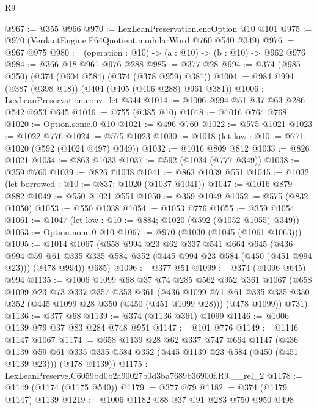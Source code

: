\begin{lexlean}{R9}
\begin{coremodule}
@967 := @355 @966
@970 := LexLeanPreservation.encOption @10 @101
@975 := @970 (VerdantEngine.F64Quotient.modularWord @760 @540 @349)
@976 := @967 @975
@980 := (operation : @10) -> (a : @10) -> (b : @10) -> @962 @976
@984 := @366 @18 @961 @976 @288
@985 := @377 @28
@994 := @374 (@985 @350) (@374 (@604 @584) (@374 (@378 @959) @381))
@1004 := @984 @994 (@387 (@398 @18)) (@404 (@405 (@406 @288) @961 @381))
@1006 := LexLeanPreservation.conv_let @344
@1014 := @1006 @994 @51 @37 @63 @286 @542 @953 @645
@1016 := @755 (@385 @10)
@1018 := @1016 @764 @768
@1020 := Option.some.{0} @10
@1021 := @496 @760
@1022 := @575 @1021
@1023 := @1022 @776
@1024 := @575 @1023
@1030 := @1018 (let low : @10 := @771; @1020 (@592 (@1024 @497) @349))
@1032 := @1016 @809 @812
@1033 := @826 @1021
@1034 := @863 @1033
@1037 := @592 (@1034 (@777 @349))
@1038 := @359 @760
@1039 := @826 @1038
@1041 := @863 @1039 @551
@1045 := @1032 (let borrowed : @10 := @837; @1020 (@1037 @1041))
@1047 := @1016 @879 @882
@1049 := @550 @1021 @551
@1050 := @359 @1049
@1052 := @575 (@832 @1050)
@1053 := @550 @1038
@1054 := @1053 @776
@1055 := @359 @1054
@1061 := @1047 (let low : @10 := @884; @1020 (@592 (@1052 @1055) @349))
@1063 := Option.none.{0} @10
@1067 := @970 (@1030 (@1045 (@1061 @1063)))
@1095 := @1014
    @1067
    (@658
      @994
      @23
      @62
      @337
      @541
      @664
      @645
      (@436
        @994
        @59
        @61
        @335
        @335
        @584
        @352
        (@445 @994 @23 @584 (@450 (@451 @994 @23)))
        (@478 @994))
      @685)
@1096 := @377 @51
@1099 := @374 (@1096 @645) @994
@1135 := @1006
    @1099
    @68
    @37
    @74
    @285
    @562
    @952
    @361
    @1067
    (@658
      @1099
      @23
      @73
      @337
      @357
      @353
      @361
      (@436
        @1099
        @71
        @61
        @335
        @335
        @350
        @352
        (@445 @1099 @28 @350 (@450 (@451 @1099 @28)))
        (@478 @1099))
      @731)
@1136 := @377 @68
@1139 := @374 (@1136 @361) @1099
@1146 := @1006 @1139 @79 @37 @83 @284 @748 @951
@1147 := @101 @776
@1149 := @1146 @1147 @1067
@1174 := @658
    @1139
    @28
    @62
    @337
    @747
    @664
    @1147
    (@436
      @1139
      @59
      @61
      @335
      @335
      @584
      @352
      (@445 @1139 @23 @584 (@450 (@451 @1139 @23)))
      (@478 @1139))
@1175 := LexLeanPreserve.C6059bd0b2a90027b0d3ba7689b36900f.R9.__rel_2
@1178 := @1149 (@1174 (@1175 @540))
@1179 := @377 @79
@1182 := @374 (@1179 @1147) @1139
@1219 := @1006
    @1182
    @88
    @37
    @91
    @283
    @750
    @950
    @498

\end{coremodule}
\end{lexlean}
